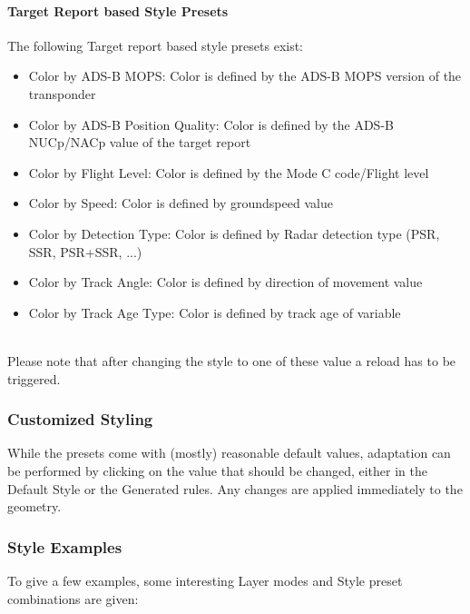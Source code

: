 \paragraph{Target Report based Style Presets}
The following Target report based style presets exist:
\begin{itemize}
 \item Color by ADS-B MOPS: Color is defined by the ADS-B MOPS version of the transponder
 \item Color by ADS-B Position Quality: Color is defined by the ADS-B NUCp/NACp value of the target report
 \item Color by Flight Level: Color is defined by the Mode C code/Flight level
 \item Color by Speed: Color is defined by groundspeed value
 \item Color by Detection Type: Color is defined by Radar detection type (PSR, SSR, PSR+SSR, ...)
 \item Color by Track Angle: Color is defined by direction of movement value
 \item Color by Track Age Type: Color is defined by track age of variable
\end{itemize}
\  \\

Please note that after changing the style to one of these value a reload has to be triggered. \\

\subsubsection{Customized Styling}

While the presets come with (mostly) reasonable default values, adaptation can be performed by clicking on the value that should be changed, either in the Default Style or the Generated rules. Any changes are applied immediately to the geometry.

\subsubsection{Style Examples}

To give a few examples, some interesting Layer modes and Style preset combinations are given:

